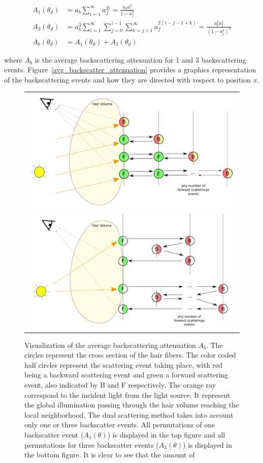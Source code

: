 \begin{align}
A_1(\theta_d) &= a_b \sum_{i=1}^{\infty} a_f^{2i} = \frac{a_b a_f^2}{1 - a_f^2} \\
A_3(\theta_d) &= a_b^3 \sum_{i=1}^{\infty}  \sum_{j=0}^{i-1} \sum_{k=j+1}^{\infty} a_f^{2(i-j-1+k)} = \frac{a_b^3 a_f^2}{(1 - a_f^2)^3} \\
A_b(\theta_d) &= A_1(\theta_d) + A_3(\theta_d)
\label{avg_backscatter_series}
\end{align}

where $A_b$ is the average backscattering attenuation for 1 and 3 backscattering events. Figure~\ref{avg_backscatter_attenuation} provides a graphics representation of the backscattering events and how they are directed with respect to position $x$.

\begin{figure}
    \begin{tabular}{c}
    \includegraphics[scale=0.25]{avg_backscatter_1.png} \\
    \includegraphics[scale=0.25]{avg_backscatter_3.png}
    \end{tabular}
    \caption{Visualization of the average backscattering attenuation $A_b$. The circles represent the cross section of the hair fibers. The color coded half circles represent the scattering event taking place, with red being a backward scattering event and green a forward scattering event, also indicated by B and F respectively. The orange ray correspond to the incident light from the light source. It represent the global illumination passing through the hair volume reaching the local neighborhood. The dual scattering method takes into account only one or three backscatter events. All permutations of one backscatter event ($A_1(\theta)$) is displayed in the top figure and all permutations for three backscatter events ($A_3(\theta)$) is displayed in the bottom figure. It is clear to see that the amount of
}
\end{figure}
